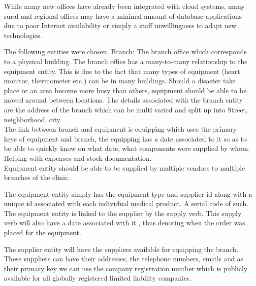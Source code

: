\documentclass{article}
\begin{document}
While many new offices have already been integrated with cloud systems, many rural and regional offices may have a minimal amount of database applications due to poor Internet availability or simply a staff unwillingness to adapt new technologies.






The following entities were chosen.
Branch: The branch office which corresponds to a physical building. 
The branch office has a many-to-many relationship to the equipment entity. This is due to the fact that many types of equipment (heart monitor, thermometer etc.) can be in many buildings. Should a disaster take place or an area become more busy than others, equipment should be able to be moved around between locations.
The details associated with the branch entity are the address of the branch which can be multi varied and split up into Street, neighborhood, city. \\








The link between branch and equipment is equipping which uses the primary keys of equipment and branch, the equipping has a date associated to it so as to be able to quickly know on what date, what components were supplied by whom. Helping with expenses and stock documentation.\\








Equipment entity should be able to be supplied by multiple vendors to multiple branches of the clinic. 


The equipment entity simply has the equipment type and supplier id along with a unique id associated with each individual medical product. A serial code of such.
The equipment  entity is linked to the supplier by the supply verb.
This supply verb will also have a date associated with it , thus denoting when the order was placed for the equipment.


The supplier entity will have the suppliers available for equipping the branch. These suppliers can have their addresses, the telephone numbers, emails and as their primary key we can use the company registration number which is publicly available for all globally registered limited liability companies.
\end{document}
